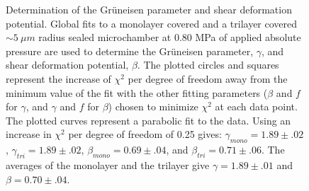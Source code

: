 \begin{figure}
\begin{center}
\end{center}
\caption{\label{gammabeta}Determination of the Gr\"{u}neisen parameter and shear deformation potential. Global fits to a monolayer covered and a trilayer covered $\sim 5 \ \mu m$ radius sealed microchamber at 0.80 MPa of applied absolute pressure are used to determine the Gr\"{u}neisen parameter, $\gamma$, and shear deformation potential, $\beta$. The plotted circles and squares represent the increase of $\chi^2$ per degree of freedom away from the minimum value of the fit with the other fitting parameters ($\beta$ and $f$ for $\gamma$, and $\gamma$ and $f$ for $\beta$) chosen to minimize $\chi^2$ at each data point. The plotted curves represent a parabolic fit to the data. Using an increase in $\chi^2$ per degree of freedom of 0.25 gives: $\gamma_{mono} = 1.89 \pm .02$, $\gamma_{tri} = 1.89 \pm .02$, $\beta_{mono} = 0.69 \pm .04$, and $\beta_{tri} = 0.71 \pm .06$. The averages of the monolayer and the trilayer give $\gamma=1.89 \pm .01$ and $\beta= 0.70 \pm .04$.}
\end{figure}

